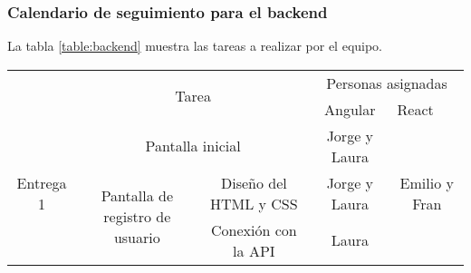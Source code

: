\documentclass[11pt, a4paper, titlepage]{article}
\begin{document}
\subsubsection{Calendario de seguimiento para el backend}
 La tabla \ref{table:backend} muestra las tareas a realizar por el equipo. \newline

\begin{landscape}
\pagestyle{empty}
\begin{table}[hbt!]
\small
\centering
\begin{tabular}{c|ccll|cc|}
\cline{2-7}
\multirow{2}{*}{}                                 & \multicolumn{4}{c|}{\multirow{2}{*}{Tarea}}                                                                                                                                                                                      & \multicolumn{2}{c|}{Personas asignadas}                                      \\ \cline{6-7}
                                                  & \multicolumn{4}{c|}{}                                                                                                                                                                                                            & \multicolumn{1}{c|}{Angular}                & \multicolumn{1}{l|}{React}     \\ \hline
\multicolumn{1}{|c|}{\multirow{14}{*}{Entrega 1}} & \multicolumn{4}{c|}{Pantalla inicial}                                                                                                                                                                                            & \multicolumn{1}{c|}{Jorge y Laura}          & \multirow{9}{*}{Emilio y Fran} \\ \cline{2-6}
\multicolumn{1}{|c|}{}                            & \multicolumn{1}{c|}{\multirow{2}{*}{Pantalla de registro de usuario}}                                           & \multicolumn{3}{c|}{Diseño del HTML y CSS}                                                                     & \multicolumn{1}{c|}{Jorge y Laura}          &                                \\ \cline{3-6}
\multicolumn{1}{|c|}{}                            & \multicolumn{1}{c|}{}                                                                                           & \multicolumn{3}{c|}{Conexión con la API}                                                                       & \multicolumn{1}{c|}{Laura}                  &                                \\ \cline{2-6}

\end{tabular}
\end{table}
\end{landscape}
\end{document}
